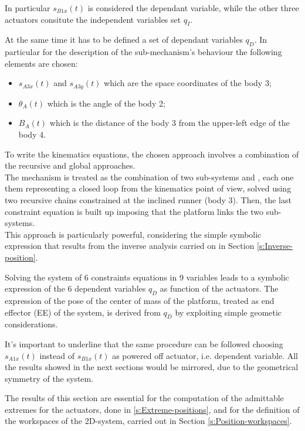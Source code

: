 \documentclass[10.5pt, twocolumn]{article}
\newcommand*\circled[1]{\tikz[baseline=(char.base)]{
  \node[shape=circle,draw,inner sep=2pt] (char) {#1};}}
\begin{document}
In particular \( s_{B1x}(t) \) is considered the dependant variable, while the other three actuators consitute the independent variables set \( q_{I} \).

At the same time it has to be defined a set of dependant variables \( q_{D} \).
In particular for the description of the sub-mechanism's behaviour the following elements are chosen:
\begin{itemize}
  \item \( s_{A3x}(t) \) and \( s_{A3y}(t) \) which are the space coordinates of the body 3;
  \item \( \theta_A(t) \) which is the angle of the body 2;
  \item \( B_A(t) \) which is the distance of the body 3 from the upper-left edge of the body 4.
\end{itemize}
To write the kinematics equations, the chosen approach involves a combination of the recursive and global approaches.\\
The mechanism is treated as the combination of two sub-systems \circled{A} and \circled{B}, each one them representing a closed loop from the kinematics point of view, solved using two recursive chains constrained at the inclined runner (body 3). Then, the last constraint equation is built up imposing that the platform links the two sub-systems.\\
This approach is particularly powerful, considering the simple symbolic expression that results from the inverse analysis carried on in Section \ref{s:Inverse-position}.

Solving the system of 6 constraints equations in 9 variables leads to a symbolic expression of the 6 dependent variables \( q_{D} \) as function of the actuators. The expression of the pose of the center of mass of the platform, treated as end effector (EE) of the system, is derived from \( q_{D} \) by exploiting simple geometic considerations.

It's important to underline that the same procedure can be followed choosing \( s_{A1x}(t) \) instead of \( s_{B1x}(t) \) as powered off actuator, i.e. dependent variable. All the results showed in the next sections would be mirrored, due to the geometrical symmetry of the system.

The results of this section are essential for the computation of the admittable extremes for the actuators, done in \ref{s:Extreme-positions}, and for the definition of the workspaces of the 2D-system, carried out in Section \ref{s:Position-workspaces}.
\end{document}
